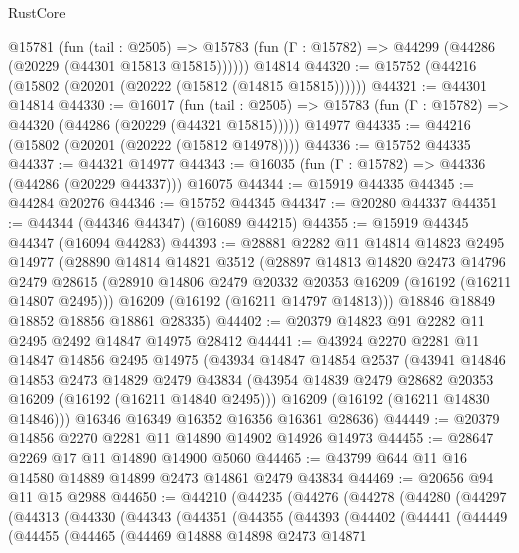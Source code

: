 \begin{lexlean}{RustCore}
\begin{coremodule}
    @15781
      (fun (tail : @2505) =>
      @15783 (fun (Γ : @15782) => @44299 (@44286 (@20229 (@44301 @15813 @15815))))))
    @14814
@44320 := @15752 (@44216 (@15802 (@20201 (@20222 (@15812 (@14815 @15815))))))
@44321 := @44301 @14814
@44330 := @16017
    (fun (tail : @2505) => @15783 (fun (Γ : @15782) => @44320 (@44286 (@20229 (@44321 @15815)))))
    @14977
@44335 := @44216 (@15802 (@20201 (@20222 (@15812 @14978))))
@44336 := @15752 @44335
@44337 := @44321 @14977
@44343 := @16035 (fun (Γ : @15782) => @44336 (@44286 (@20229 @44337))) @16075
@44344 := @15919 @44335
@44345 := @44284 @20276
@44346 := @15752 @44345
@44347 := @20280 @44337
@44351 := @44344 (@44346 @44347) (@16089 @44215)
@44355 := @15919 @44345 @44347 (@16094 @44283)
@44393 := @28881
    @2282
    @11
    @14814
    @14823
    @2495
    @14977
    (@28890
      @14814
      @14821
      @3512
      (@28897
        @14813
        @14820
        @2473
        @14796
        @2479
        @28615
        (@28910 @14806 @2479 @20332 @20353 @16209 (@16192 (@16211 @14807 @2495)))
        @16209
        (@16192 (@16211 @14797 @14813)))
      @18846
      @18849
      @18852
      @18856
      @18861
      @28335)
@44402 := @20379 @14823 @91 @2282 @11 @2495 @2492 @14847 @14975 @28412
@44441 := @43924
    @2270
    @2281
    @11
    @14847
    @14856
    @2495
    @14975
    (@43934
      @14847
      @14854
      @2537
      (@43941
        @14846
        @14853
        @2473
        @14829
        @2479
        @43834
        (@43954 @14839 @2479 @28682 @20353 @16209 (@16192 (@16211 @14840 @2495)))
        @16209
        (@16192 (@16211 @14830 @14846)))
      @16346
      @16349
      @16352
      @16356
      @16361
      @28636)
@44449 := @20379 @14856 @2270 @2281 @11 @14890 @14902 @14926 @14973
@44455 := @28647 @2269 @17 @11 @14890 @14900 @5060
@44465 := @43799 @644 @11 @16 @14580 @14889 @14899 @2473 @14861 @2479 @43834
@44469 := @20656 @94 @11 @15 @2988
@44650 := @44210
    (@44235
      (@44276
        (@44278
          (@44280
            (@44297
              (@44313
                (@44330
                  (@44343
                    (@44351
                      (@44355
                        (@44393
                          (@44402
                            (@44441
                              (@44449
                                (@44455
                                  (@44465
                                    (@44469
                                      @14888
                                      @14898
                                      @2473
                                      @14871

\end{coremodule}
\end{lexlean}
